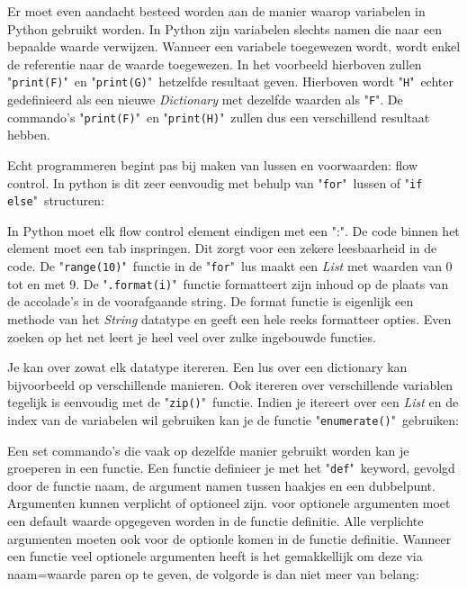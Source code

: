 \documentclass[11pt,twoside]{article}
\begin{document}
Er moet even aandacht besteed worden aan de manier waarop variabelen in Python gebruikt worden. In Python zijn variabelen slechts namen die naar een bepaalde waarde verwijzen. Wanneer een variabele toegewezen wordt, wordt enkel de referentie naar de waarde toegewezen. In het voorbeeld hierboven zullen "\lstinline{print(F)}"\ en "\lstinline{print(G)}"\ hetzelfde resultaat geven. Hierboven wordt "\lstinline{H}"\ echter gedefinieerd als een nieuwe \emph{Dictionary} met dezelfde waarden als "\lstinline{F}". De commando's "\lstinline{print(F)}"\ en "\lstinline{print(H)}"\ zullen dus een verschillend resultaat hebben.

Echt programmeren begint pas bij maken van lussen en voorwaarden: flow control. In python is dit zeer eenvoudig met behulp van "\lstinline{for}"\ lussen of "\lstinline{if else}"\ structuren:


In Python moet elk flow control element eindigen met een ":". De code binnen het element moet een tab inspringen. Dit zorgt voor een zekere leesbaarheid in de code. De "\lstinline{range(10)}"\ functie in de "\lstinline{for}"\ lus maakt een \emph{List} met waarden van 0 tot en met 9. De "\lstinline{.format(i)}"\ functie formatteert zijn inhoud op de plaats van de accolade's in de voorafgaande string. De format functie is eigenlijk een methode van het \emph{String} datatype en geeft een hele reeks formatteer opties. Even zoeken op het net leert je heel veel over zulke ingebouwde functies.

Je kan over zowat elk datatype itereren. Een lus over een dictionary kan bijvoorbeeld op verschillende manieren. Ook itereren over verschillende variablen tegelijk is eenvoudig met de "\lstinline{zip()}"\ functie. Indien je itereert over een \emph{List} en de index van de variabelen wil gebruiken kan je de functie "\lstinline{enumerate()}"\ gebruiken:


Een set commando's die vaak op dezelfde manier gebruikt worden kan je groeperen in een functie. Een functie definieer je met het "\lstinline{def}"\ keyword, gevolgd door de functie naam, de argument namen tussen haakjes en een dubbelpunt. Argumenten kunnen verplicht of optioneel zijn. voor optionele argumenten moet een default waarde opgegeven worden in de functie definitie. Alle verplichte argumenten moeten ook voor de optionle komen in de functie definitie. Wanneer een functie veel optionele argumenten heeft is het gemakkellijk om deze via naam=waarde paren op te geven, de volgorde is dan niet meer van belang:

\end{document}
